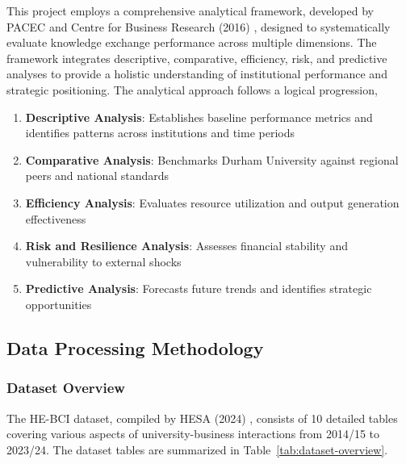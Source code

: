 \documentclass[journal,onecolumn, 10pt,draftclsnofoot]{IEEEtran}
\begin{document}
This project employs a comprehensive analytical framework, developed by PACEC and Centre for Business Research (2016) \cite{pacec2016state}, designed to systematically evaluate knowledge exchange performance across multiple dimensions. The framework integrates descriptive, comparative, efficiency, risk, and predictive analyses to provide a holistic understanding of institutional performance and strategic positioning. The analytical approach follows a logical progression,
\begin{enumerate}
    \item \textbf{Descriptive Analysis}: Establishes baseline performance metrics and identifies patterns across institutions and time periods
    \item \textbf{Comparative Analysis}: Benchmarks Durham University against regional peers and national standards
    \item \textbf{Efficiency Analysis}: Evaluates resource utilization and output generation effectiveness
    \item \textbf{Risk and Resilience Analysis}: Assesses financial stability and vulnerability to external shocks
    \item \textbf{Predictive Analysis}: Forecasts future trends and identifies strategic opportunities
\end{enumerate}

\subsection{Data Processing Methodology}

\subsubsection{Dataset Overview}
The HE-BCI dataset, compiled by HESA (2024) \cite{hesa_he_bci_2024}, consists of 10 detailed tables covering various aspects of university-business interactions from 2014/15 to 2023/24. The dataset tables are summarized in Table~\ref{tab:dataset-overview}.
\end{document}
